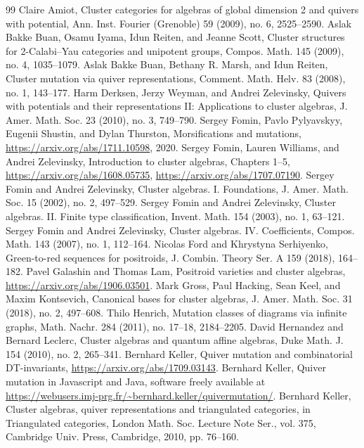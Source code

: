 \documentclass[10pt]{amsart}
\theoremstyle{definition}
\begin{document}
\begin{thebibliography}{99}
 Claire Amiot, Cluster categories for algebras of global dimension 2 and quivers with potential, Ann. Inst. Fourier (Grenoble) 59 (2009), no. 6, 2525--2590.
 Aslak Bakke Buan, Osamu Iyama, Idun Reiten, and Jeanne Scott, Cluster structures for 2-Calabi--Yau categories and unipotent groups, Compos. Math. 145 (2009), no. 4, 1035--1079.
 Aslak Bakke Buan, Bethany R. Marsh, and Idun Reiten, Cluster mutation via quiver representations, Comment. Math. Helv. 83 (2008), no. 1, 143--177.
 Harm Derksen, Jerzy Weyman, and Andrei Zelevinsky, Quivers with potentials and their representations II: Applications to cluster algebras, J. Amer. Math. Soc. 23 (2010), no. 3, 749--790.
 Sergey Fomin, Pavlo Pylyavskyy, Eugenii Shustin, and Dylan Thurston, Morsifications and mutations, \url{https://arxiv.org/abs/1711.10598}, 2020.
 Sergey Fomin, Lauren Williams, and Andrei Zelevinsky, Introduction to cluster algebras, Chapters 1--5, \url{https://arxiv.org/abs/1608.05735}, \url{https://arxiv.org/abs/1707.07190}.
 Sergey Fomin and Andrei Zelevinsky, Cluster algebras. I. Foundations, J. Amer. Math. Soc. 15 (2002), no. 2, 497--529.
 Sergey Fomin and Andrei Zelevinsky, Cluster algebras. II. Finite type classification, Invent. Math. 154 (2003), no. 1, 63--121.
 Sergey Fomin and Andrei Zelevinsky, Cluster algebras. IV. Coefficients, Compos. Math. 143 (2007), no. 1, 112--164.
 Nicolas Ford and Khrystyna Serhiyenko, Green-to-red sequences for positroids, J. Combin. Theory Ser. A 159 (2018), 164--182.
 Pavel Galashin and Thomas Lam, Positroid varieties and cluster algebras, \url{https://arxiv.org/abs/1906.03501}.
 Mark Gross, Paul Hacking, Sean Keel, and Maxim Kontsevich, Canonical bases for cluster algebras, J. Amer. Math. Soc. 31 (2018), no. 2, 497--608.
 Thilo Henrich, Mutation classes of diagrams via infinite graphs, Math. Nachr. 284 (2011), no. 17--18, 2184--2205.
 David Hernandez and Bernard Leclerc, Cluster algebras and quantum affine algebras, Duke Math. J. 154 (2010), no. 2, 265--341.
 Bernhard Keller, Quiver mutation and combinatorial DT-invariants, \url{https://arxiv.org/abs/1709.03143}.
 Bernhard Keller, Quiver mutation in Javascript and Java, software freely available at \url{https://webusers.imj-prg.fr/~bernhard.keller/quivermutation/}.
 Bernhard Keller, Cluster algebras, quiver representations and triangulated categories, in Triangulated categories, London Math. Soc. Lecture Note Ser., vol. 375, Cambridge Univ. Press, Cambridge, 2010, pp. 76--160.

\end{thebibliography}
\end{document}
